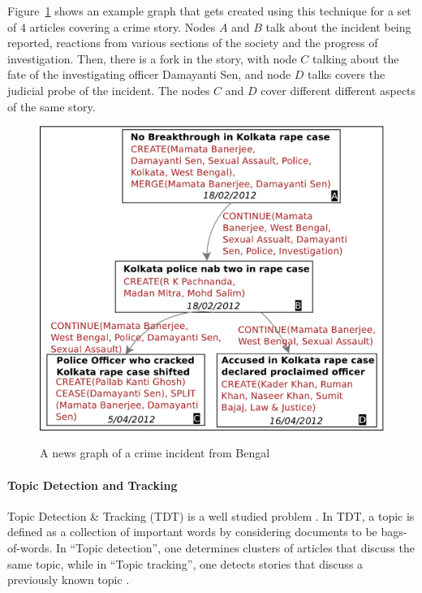 Figure~\ref{fig:sample-news-graph} shows an example graph that gets created using this technique for a set of 4
articles covering a crime story. Nodes $A$ and $B$ talk about the incident being reported, reactions from various sections of the society and
the progress of investigation. Then, there is a fork in the story, with node $C$ talking about the fate of the investigating officer Damayanti Sen, 
and node $D$ talks covers the judicial probe of the incident. The nodes $C$ and $D$ cover different different aspects of the same story.
\begin{figure}
\caption{A news graph of a crime incident from Bengal}
\includegraphics[scale=0.36]{figures/graph-1.pdf}
\label{fig:sample-news-graph}
\end{figure}
\paragraph*{Topic Detection and Tracking} Topic Detection \& Tracking (TDT) is a well studied problem \cite{springerlink:10.1023/B:INRT.0000011210.12953.86, springerlink:10.1007, Franz:2001:USC:383952.384013}. In TDT, a topic is defined as a collection of important words by considering documents to be bags-of-words. In ``Topic detection'', one determines clusters of articles that discuss the same topic, while in ``Topic tracking'', one detects stories that discuss a previously known topic \cite{Allan:2002:TDT:772260}. 

